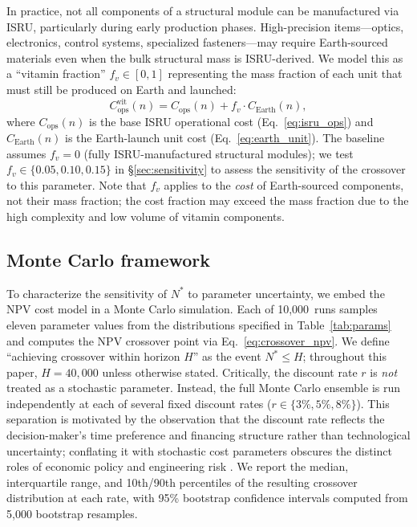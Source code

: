 \documentclass[preprint,12pt]{elsarticle}
\begin{document}
In practice, not all components of a structural module can be manufactured via ISRU, particularly during early production phases. High-precision items---optics, electronics, control systems, specialized fasteners---may require Earth-sourced materials even when the bulk structural mass is ISRU-derived. We model this as a ``vitamin fraction'' $f_v \in [0, 1]$ representing the mass fraction of each unit that must still be produced on Earth and launched:
\begin{equation}
  C_{\mathrm{ops}}^{\mathrm{vit}}(n) = C_{\mathrm{ops}}(n) + f_v \cdot C_{\mathrm{Earth}}(n),
  \label{eq:vitamin}
\end{equation}
where $C_{\mathrm{ops}}(n)$ is the base ISRU operational cost (Eq.~\ref{eq:isru_ops}) and $C_{\mathrm{Earth}}(n)$ is the Earth-launch unit cost (Eq.~\ref{eq:earth_unit}). The baseline assumes $f_v = 0$ (fully ISRU-manufactured structural modules); we test $f_v \in \{0.05, 0.10, 0.15\}$ in \S\ref{sec:sensitivity} to assess the sensitivity of the crossover to this parameter. Note that $f_v$ applies to the \emph{cost} of Earth-sourced components, not their mass fraction; the cost fraction may exceed the mass fraction due to the high complexity and low volume of vitamin components.

\subsection{Monte Carlo framework}

To characterize the sensitivity of $N^*$ to parameter uncertainty, we embed the NPV cost model in a Monte Carlo simulation. Each of 10{,}000~runs samples eleven parameter values from the distributions specified in Table~\ref{tab:params} and computes the NPV crossover point via Eq.~\ref{eq:crossover_npv}. We define ``achieving crossover within horizon $H$'' as the event $N^* \leq H$; throughout this paper, $H = 40{,}000$ unless otherwise stated. Critically, the discount rate $r$ is \emph{not} treated as a stochastic parameter. Instead, the full Monte Carlo ensemble is run independently at each of several fixed discount rates ($r \in \{3\%, 5\%, 8\%\}$). This separation is motivated by the observation that the discount rate reflects the decision-maker's time preference and financing structure rather than technological uncertainty; conflating it with stochastic cost parameters obscures the distinct roles of economic policy and engineering risk \cite{arrow2014}. We report the median, interquartile range, and 10th/90th percentiles of the resulting crossover distribution at each rate, with 95\% bootstrap confidence intervals computed from 5{,}000 bootstrap resamples.
\end{document}
